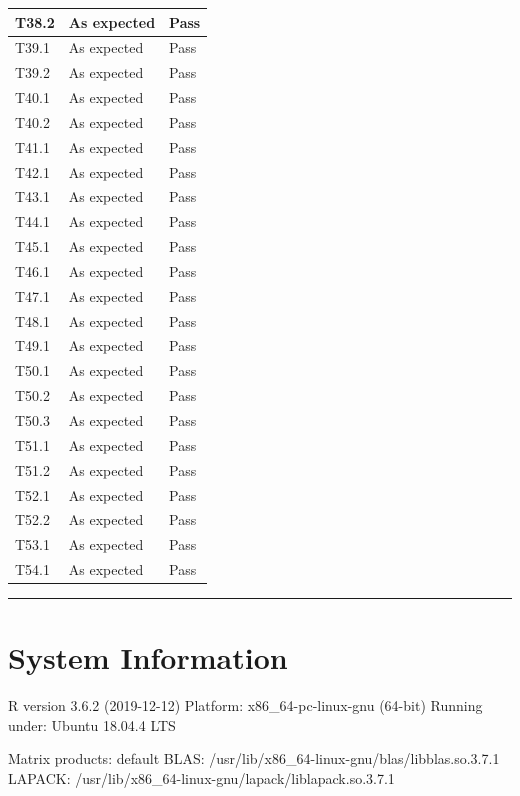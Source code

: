 \documentclass[]{article}
\begin{document}
\begin{longtable}{l|l|l}
\hline
T38.2 & As expected & Pass\\
\hline
T39.1 & As expected & Pass\\
\hline
T39.2 & As expected & Pass\\
\hline
T40.1 & As expected & Pass\\
\hline
T40.2 & As expected & Pass\\
\hline
T41.1 & As expected & Pass\\
\hline
T42.1 & As expected & Pass\\
\hline
T43.1 & As expected & Pass\\
\hline
T44.1 & As expected & Pass\\
\hline
T45.1 & As expected & Pass\\
\hline
T46.1 & As expected & Pass\\
\hline
T47.1 & As expected & Pass\\
\hline
T48.1 & As expected & Pass\\
\hline
T49.1 & As expected & Pass\\
\hline
T50.1 & As expected & Pass\\
\hline
T50.2 & As expected & Pass\\
\hline
T50.3 & As expected & Pass\\
\hline
T51.1 & As expected & Pass\\
\hline
T51.2 & As expected & Pass\\
\hline
T52.1 & As expected & Pass\\
\hline
T52.2 & As expected & Pass\\
\hline
T53.1 & As expected & Pass\\
\hline
T54.1 & As expected & Pass\\
\hline
\end{longtable}

\begin{center}\rule{0.5\linewidth}{0.5pt}\end{center}

\hypertarget{system-information}{%
\section{System Information}\label{system-information}}

R version 3.6.2 (2019-12-12) Platform: x86\_64-pc-linux-gnu (64-bit)
Running under: Ubuntu 18.04.4 LTS

Matrix products: default BLAS:
/usr/lib/x86\_64-linux-gnu/blas/libblas.so.3.7.1 LAPACK:
/usr/lib/x86\_64-linux-gnu/lapack/liblapack.so.3.7.1
\end{document}
